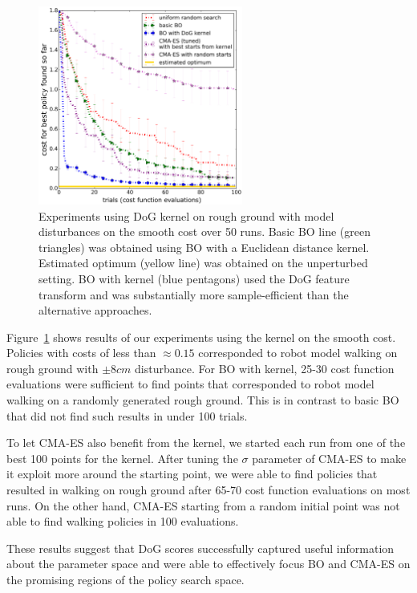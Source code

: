 \begin{figure}[t]
\centering
\includegraphics[width=0.6\textwidth]{img/rnd_bo_bo_covLoc_cma_rough6_disturb_smooth_cost.png}
\caption{Experiments using DoG kernel on rough ground with model disturbances on the smooth cost over 50 runs. Basic BO line (green triangles) was obtained using BO with a Euclidean distance kernel. Estimated optimum (yellow line) was obtained on the unperturbed setting. BO with \dogkernel kernel (blue pentagons) used the DoG feature transform and was substantially more sample-efficient than the alternative approaches.}
\label{fig_bo_locomotion}
\end{figure}

Figure~\ref{fig_bo_locomotion} shows results of our experiments using the \dogkernel kernel on the smooth cost.
Policies with costs of less than $\approx\!\!0.15$ corresponded to robot model walking on rough ground with $\pm 8 cm$ disturbance.
For BO with \dogkernel kernel, 25-30 cost function evaluations were sufficient to find points that corresponded to robot model walking on a randomly generated rough ground. This is in contrast to basic BO that did not find such results in under 100 trials. 

To let CMA-ES also benefit from the kernel, we started each run from one of the best 100 points for the \dogkernel kernel. After tuning the $\sigma$ parameter of CMA-ES to make it exploit more around the starting point, we were able to find policies that resulted in walking on rough ground after 65-70 cost function evaluations on most runs. On the other hand, \mbox{CMA-ES} starting from a random initial point was not able to find walking policies in 100 evaluations.

These results suggest that DoG scores successfully captured useful information about the parameter space and were able to effectively focus BO and CMA-ES on the promising regions of the policy search space. 

